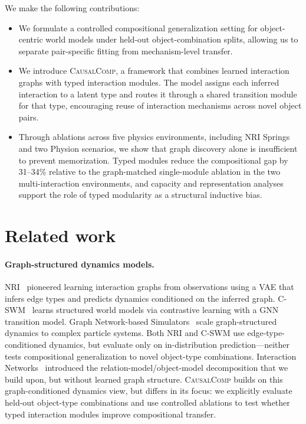 \documentclass{article}
\newcommand{\ours}{\textsc{CausalComp}}
\begin{document}
We make the following contributions:
\begin{itemize}[leftmargin=1.5em, itemsep=0.4em]
    \item We formulate a controlled compositional generalization setting for object-centric world models under held-out object-combination splits, allowing us to separate pair-specific fitting from mechanism-level transfer.

    \item We introduce \ours{}, a framework that combines learned interaction graphs with typed interaction modules. The model assigns each inferred interaction to a latent type and routes it through a shared transition module for that type, encouraging reuse of interaction mechanisms across novel object pairs.

    \item Through ablations across five physics environments, including NRI Springs and two Physion scenarios, we show that graph discovery alone is insufficient to prevent memorization. Typed modules reduce the compositional gap by 31--34\% relative to the graph-matched single-module ablation in the two multi-interaction environments, and capacity and representation analyses support the role of typed modularity as a structural inductive bias.
\end{itemize}

\section{Related work}
\label{sec:related}

\paragraph{Graph-structured dynamics models.}
NRI~\citep{kipf2018nri} pioneered learning interaction graphs from observations using a VAE that infers edge types and predicts dynamics conditioned on the inferred graph. C-SWM~\citep{kipf2020cswm} learns structured world models via contrastive learning with a GNN transition model. Graph Network-based Simulators~\citep{sanchez2020learning} scale graph-structured dynamics to complex particle systems. Both NRI and C-SWM use edge-type-conditioned dynamics, but evaluate only on in-distribution prediction---neither tests compositional generalization to novel object-type combinations. Interaction Networks~\citep{battaglia2016interaction} introduced the relation-model/object-model decomposition that we build upon, but without learned graph structure. \ours{} builds on this graph-conditioned dynamics view, but differs in its focus: we explicitly evaluate held-out object-type combinations and use controlled ablations to test whether typed interaction modules improve compositional transfer.
\end{document}
